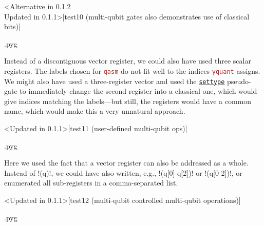 \documentclass{scrartcl}
\makeatletter
\newenvironment{codeexample}{%
   \VerbatimEnvironment%
   \let\FVB@VerbatimOut\minted@FVB@VerbatimOut
   \let\FVE@VerbatimOut\minted@FVE@VerbatimOut
   \minted@configlang{tex}%
   \minted@fvset
   \begin{VerbatimOut}[codes={\catcode`\^^I=12},firstline,lastline]{\minted@jobname.pyg}%
}{
   \end{VerbatimOut}%
   \minted@langlinenoson%
   \savebox\codeexamplebox{ \minted@jobname.pyg}%
   \ifdim\wd\codeexamplebox>\dimexpr.5\linewidth-3mm\relax%
      \wd\codeexamplebox=.5\linewidth%
   \else%
      \wd\codeexamplebox=\dimexpr\wd\codeexamplebox+3mm\relax%
   \fi%
   \noindent\begin{minipage}{\wd\codeexamplebox}%
      \centering%
      \usebox\codeexamplebox%
   \end{minipage}%
   \begin{minipage}{\dimexpr\linewidth-\wd\codeexamplebox\relax}%
      \expandafter\minted@pygmentize\expandafter{\minted@lang}%
   \end{minipage}%
   \minted@langlinenosoff%
   \par%
}
\def\pkg#1{\textcolor{brown}{\texttt{#1}}}
\def\gate#1{\hyperref[gate:#1]{\texttt{#1}}}
\def\Yquant{\pkg{yquant}}
\makeatother
\begin{document}
         \begin{example}<Alternative in 0.1.2\\Updated in 0.1.1>[test10 (multi-qubit gates also demonstrates use of classical bits)]
            \begin{codeexample}
            \end{codeexample}
            Instead of a discontiguous vector register, we could also have used three scalar registers.
            The labels chosen for \pkg{qasm} do not fit well to the indices \Yquant{} assigns.
            We might also have used a three\hyp register vector and used the \gate{settype} pseudo\hyp gate to immediately change the second register into a classical one, which would give indices matching the labels---but still, the registers would have a common name, which would make this a very unnatural approach.
         \end{example}

         \clearpage
         \begin{example}<Updated in 0.1.1>[test11 (user-defined multi-qubit ops)]
            \begin{codeexample}
            \end{codeexample}
            Here we used the fact that a vector register can also be addressed as a whole.
            Instead of \tex!(q)!, we could have also written, e.g., \tex!(q[0]-q[2])! or \tex!(q[0-2])!, or enumerated all sub\hyp registers in a comma\hyp separated list.
         \end{example}

         \begin{example}<Updated in 0.1.1>[test12 (multi-qubit controlled multi-qubit operations)]
            \begin{codeexample}
            \end{codeexample}
         \end{example}
\end{document}
